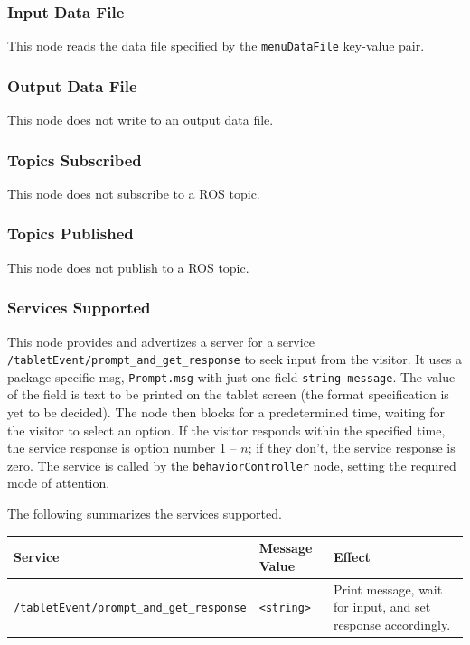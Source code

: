 \documentclass{CSSRforAfrica}
\begin{document}
{\subsubsection*{Input Data File}
This node reads the data file specified by the {\small \verb+menuDataFile+} key-value pair.


\subsubsection*{Output Data File}
This node does not write to an output data file.


\subsubsection*{Topics Subscribed}

This node does not subscribe to a ROS topic.



\subsubsection*{Topics Published}

This node does not publish to a ROS topic.
 

\subsubsection*{Services Supported}

This node  provides and advertizes a server for a service {\small \verb+/tabletEvent/prompt_and_get_response+} to seek input from the visitor.  It uses a package-specific msg, {\small \verb+Prompt.msg+} with just one field  {\small \verb+string message+}. The value of the field is text to be printed on the tablet screen (the format specification is yet to be decided). The node then blocks for a predetermined time, waiting for the visitor to select an option.    If the visitor responds within the specified time, the service response is option number 1 -- $n$; if they don't, the service response is zero.  
The service  is called by  the {\small \verb+behaviorController+} node, setting the required  mode of attention.

\newpage
\noindent The following summarizes the services supported.

\begin{center}
\begin{tabularx}{\linewidth}{| l | l | X|}
\hline 
{\small Service }                                                                                & {\small Message Value}    &  {\small Effect}       \\
\hline
{\footnotesize \verb+/tabletEvent/prompt_and_get_response+ }  & {\footnotesize \verb+<string>+} & {\small Print message, wait for input, and set response accordingly.}\\
\hline
\end{tabularx}
\end{center}

}
\end{document}
